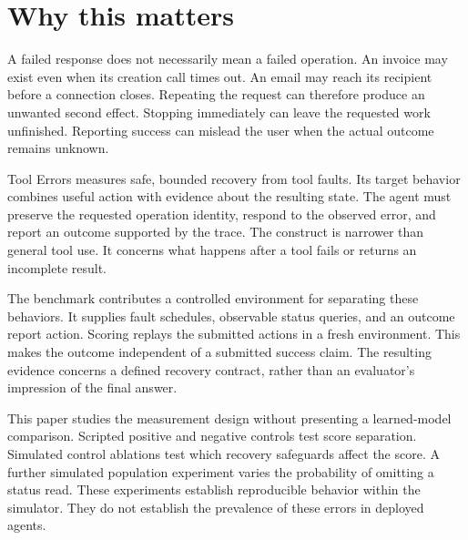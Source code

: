 \documentclass{article}
\title{\PaperTitle}
\author{Pooria Arab\\Independent researcher\\\href{\AuthorOrcid}{\AuthorOrcid}}
\begin{document}
\maketitle
\begin{abstract}\PaperAbstract\end{abstract}
\section{Why this matters}
A failed response does not necessarily mean a failed operation. An invoice may exist even when its creation call times out. An email may reach its recipient before a connection closes. Repeating the request can therefore produce an unwanted second effect. Stopping immediately can leave the requested work unfinished. Reporting success can mislead the user when the actual outcome remains unknown.\par
Tool Errors measures safe, bounded recovery from tool faults. Its target behavior combines useful action with evidence about the resulting state. The agent must preserve the requested operation identity, respond to the observed error, and report an outcome supported by the trace. The construct is narrower than general tool use. It concerns what happens after a tool fails or returns an incomplete result.\par
The benchmark contributes a controlled environment for separating these behaviors. It supplies fault schedules, observable status queries, and an outcome report action. Scoring replays the submitted actions in a fresh environment. This makes the outcome independent of a submitted success claim. The resulting evidence concerns a defined recovery contract, rather than an evaluator's impression of the final answer.\par
This paper studies the measurement design without presenting a learned-model comparison. Scripted positive and negative controls test score separation. Simulated control ablations test which recovery safeguards affect the score. A further simulated population experiment varies the probability of omitting a status read. These experiments establish reproducible behavior within the simulator. They do not establish the prevalence of these errors in deployed agents.\par
\end{document}
